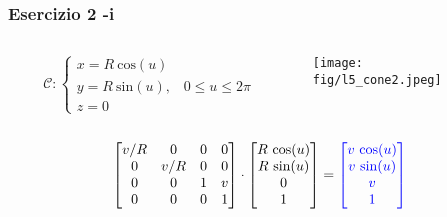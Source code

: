 \documentclass{beamer}
\newcommand{\fig}{./figures} %
\newcommand{\msin}{\mbox{sin}} %
\newcommand{\mcos}{\mbox{cos}} %
\begin{document}
\begin{frame}
\frametitle{Esercizio 2 -i }
\begin{columns}
\begin{column}{0.58\textwidth}
\begin{displaymath}
\mathcal{C}:
\begin{cases}
x = R~\mcos(u)\\
y = R~\msin(u), \;\;\;0\le u\le 2\pi\\
z = 0
\end{cases}
\end{displaymath}
\end{column}
\begin{column}{0.39\textwidth}
\texttt{[image: \\fig/l5\_cone2.jpeg]}

\end{column}
\end{columns}
%
\vspace{0.1\textheight}
\begin{displaymath}
\begin{bmatrix}
v/R & 0 & 0 & 0\\
0 & v/R & 0 & 0\\
0 & 0   & 1 & v\\
0 & 0   & 0 & 1
\end{bmatrix}
\cdot
\begin{bmatrix}
R~\mcos(u)\\
R~\msin(u)\\
0\\
1
\end{bmatrix}
= 
{\color{blue}
\begin{bmatrix}
v ~\mcos(u)\\
v ~\msin(u)\\
v\\
1
\end{bmatrix}
}
\end{displaymath}
\end{frame}
%
\end{document}
